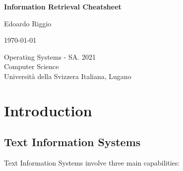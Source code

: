 \documentclass{article}
\begin{document}
\begin{titlepage}
    \begin{center}
        \vspace*{1cm}
        
        \Huge
        \textbf{Information Retrieval Cheatsheet}
        
        \vspace{0.5cm}
        \LARGE
        
        \vspace{.5cm}
        
        Edoardo Riggio
   		  \vspace{1.5cm}
       
        \vfill
        
        \today
        
        \vspace{.8cm}
          \Large
          Operating Systems - SA. 2021 \\
        Computer Science\\
        Universit\`{a} della Svizzera Italiana, Lugano\\
        
    \end{center}
\end{titlepage}

\tableofcontents

\newpage

\section{Introduction}
\subsection{Text Information Systems}
Text Information Systems involve three main capabilities:
\end{document}
